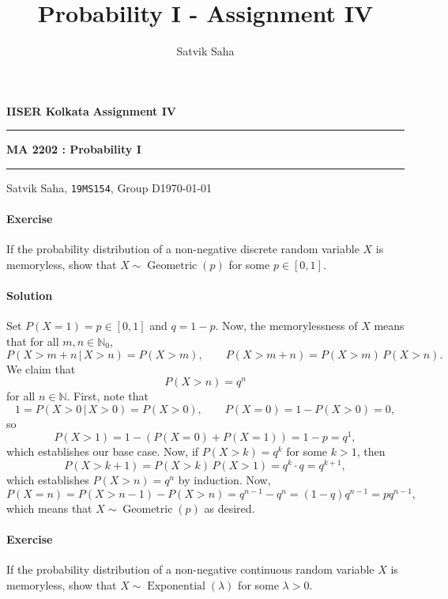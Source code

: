 \documentclass[10pt]{article}
\title{Probability I - Assignment IV}
\author{Satvik Saha}
\date{}
\newcounter{prob}
\def\problem{\stepcounter{prob}\paragraph{Exercise \arabic{prob}}}
\def\solution{\paragraph{Solution}}
\newcommand\op[1]{\operatorname{#1}}
\begin{document}
        \par\textbf{IISER Kolkata} \hfill \textbf{Assignment IV}
        \vspace{3pt}
        \hrule
        \vspace{3pt}
        \begin{center}
                \LARGE{\textbf{MA 2202 : Probability I}}
        \end{center}
        \vspace{3pt}
        \hrule
        \vspace{3pt}
        Satvik Saha, \texttt{19MS154}, Group D\hfill\today
        \vspace{20pt}

        \problem If the probability distribution of a non-negative discrete random
        variable $X$ is memoryless, show that $X \sim \op{Geometric}(p)$ for some $p
        \in [0, 1]$.

        \solution Set $P(X = 1) = p \in [0, 1]$ and $q = 1 - p$.
        Now, the memorylessness of $X$ means that for all $m, n \in \mathbb{N}_0$, \[
            P(X > m + n \,|\, X > n) = P(X > m), \qquad
            P(X > m + n) = P(X > m)\, P(X > n).
        \] We claim that \[
            P(X > n) = q^{n}
        \] for all $n \in \mathbb{N}$. First, note that \[
            1 = P(X > 0 \,|\, X > 0) = P(X > 0), \qquad P(X = 0) = 1 - P(X > 0) = 0,
        \] so \[
            P(X > 1) = 1 - (P(X = 0) + P(X = 1)) = 1 - p = q^1,
        \] which establishes our base case. Now, if $P(X > k) = q^{k}$ for some
        $k > 1$, then \[
            P(X > k + 1) = P(X > k) \, P(X > 1) = q^{k} \cdot q = q^{k + 1},
        \] which establishes $P(X > n) = q^n$ by induction.
        Now, \[
            P(X = n) = P(X > n - 1) - P(X > n) = q^{n - 1} - q^n = (1 - q)q^{n - 1} 
            = pq^{n - 1},
        \] which means that $X \sim \op{Geometric}(p)$ as desired.
        

        \problem If the probability distribution of a non-negative continuous random
        variable $X$ is memoryless, show that $X \sim \op{Exponential}(\lambda)$ for
        some $\lambda > 0$.
\end{document}
